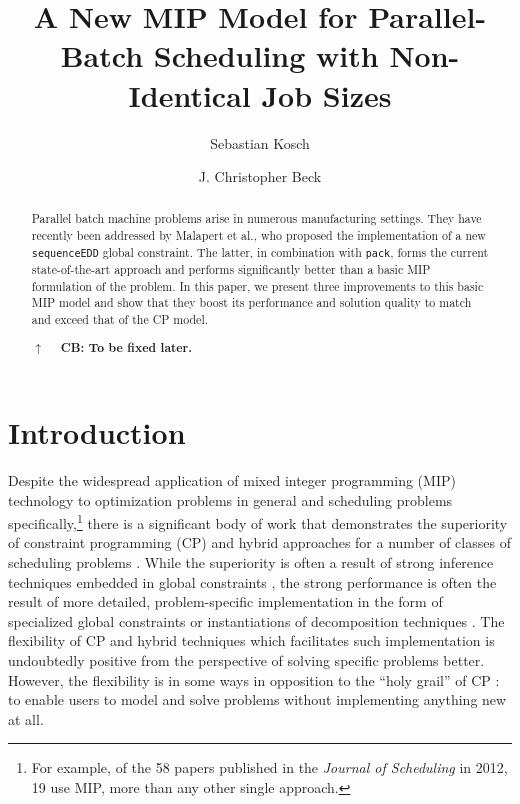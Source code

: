 \documentclass[oribibl]{llncs}
\begin{document}
\title{A New MIP Model for Parallel-Batch Scheduling with Non-Identical Job Sizes}
\author{Sebastian Kosch \and J. Christopher Beck}

\maketitle

\begin{abstract}
  Parallel batch machine problems arise in numerous manufacturing
  settings. They have recently been addressed by Malapert et al., who
  proposed the implementation of a new \texttt{sequenceEDD} global
  constraint. The latter, in combination with \texttt{pack}, forms the
  current state-of-the-art approach and performs significantly better
  than a basic MIP formulation of the problem. In this paper, we present
  three improvements to this basic MIP model and show that they boost its
  performance and solution quality to match and exceed that of the CP
  model.

  \textbf{$\uparrow\quad$ CB: To be fixed later.}
\end{abstract}

\section{Introduction}

Despite the widespread application of mixed integer programming (MIP)
technology to optimization problems in general and scheduling problems
specifically,\footnote{For example, of the 58 papers published in the
\emph{Journal of Scheduling} in 2012, 19 use MIP, more than any other
single approach.} there is a significant body of work that demonstrates
the superiority of constraint programming (CP) and hybrid approaches for
a number of classes of scheduling problems \cite{some_sched_papers}.
While the superiority is often a result of strong inference techniques
embedded in global constraints \cite{cumulative}, the strong performance
is often the result of more detailed, problem-specific implementation in
the form of specialized global constraints \cite{Malapert} or
instantiations of decomposition techniques \cite{Hooker_etc}. The
flexibility of CP and hybrid techniques which facilitates such
implementation is undoubtedly positive from the perspective of solving
specific problems better. However, the flexibility is in some ways in
opposition to the ``holy grail'' of CP \cite{Freuder97a}: to enable
users to model and solve problems without implementing anything new at
all.
\end{document}

